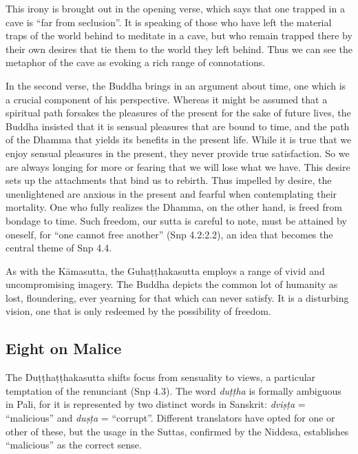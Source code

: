 \documentclass[12pt,openany]{book}%
\begin{document}
This irony is brought out in the opening verse, which says that one trapped in a cave is “far from seclusion”. It is speaking of those who have left the material traps of the world behind to meditate in a cave, but who remain trapped there by their own desires that tie them to the world they left behind. Thus we can see the metaphor of the cave as evoking a rich range of connotations.

In the second verse, the Buddha brings in an argument about time, one which is a crucial component of his perspective. Whereas it might be assumed that a spiritual path forsakes the pleasures of the present for the sake of future lives, the Buddha insisted that it is sensual pleasures that are bound to time, and the path of the Dhamma that yields its benefits in the present life. While it is true that we enjoy sensual pleasures in the present, they never provide true satisfaction. So we are always longing for more or fearing that we will lose what we have. This desire sets up the attachments that bind us to rebirth. Thus impelled by desire, the unenlightened are anxious in the present and fearful when contemplating their mortality. One who fully realizes the Dhamma, on the other hand, is freed from bondage to time. Such freedom, our sutta is careful to note, must be attained by oneself, for “one cannot free another” (Snp 4.2:2.2), an idea that becomes the central theme of Snp 4.4.

As with the \textsanskrit{Kāmasutta}, the \textsanskrit{Guhaṭṭhakasutta} employs a range of vivid and uncompromising imagery. The Buddha depicts the common lot of humanity as lost, floundering, ever yearning for that which can never satisfy. It is a disturbing vision, one that is only redeemed by the possibility of freedom.

\subsection*{Eight on Malice}

The \textsanskrit{Duṭṭhaṭṭhakasutta} shifts focus from sensuality to views, a particular temptation of the renunciant (Snp 4.3). The word \textit{\textsanskrit{duṭṭha}} is formally ambiguous in Pali, for it is represented by two distinct words in Sanskrit: \textit{\textsanskrit{dviṣṭa}} = “malicious” and \textit{\textsanskrit{duṣṭa}} = “corrupt”. Different translators have opted for one or other of these, but the usage in the Suttas, confirmed by the Niddesa, establishes “malicious” as the correct sense.
\end{document}
